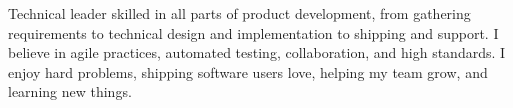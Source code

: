 

\begin{cvparagraph}

Technical leader skilled in all parts of product development, from gathering requirements to technical design and implementation to shipping and support.
I believe in agile practices, automated testing, collaboration, and high standards.
I enjoy hard problems, shipping software users love, helping my team grow, and learning new things.

\end{cvparagraph}
